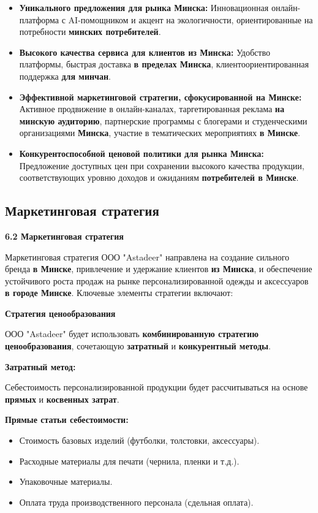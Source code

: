 \begin{itemize}
    \item \textbf{Уникального предложения для рынка Минска:} Инновационная онлайн-платформа с AI-помощником и акцент на экологичности, ориентированные на потребности \textbf{минских потребителей}.
    \item \textbf{Высокого качества сервиса для клиентов из Минска:}  Удобство платформы, быстрая доставка \textbf{в пределах Минска}, клиентоориентированная поддержка \textbf{для минчан}.
    \item \textbf{Эффективной маркетинговой стратегии, сфокусированной на Минске:}  Активное продвижение в онлайн-каналах, таргетированная реклама \textbf{на минскую аудиторию}, партнерские программы с блогерами и студенческими организациями \textbf{Минска}, участие в тематических мероприятиях \textbf{в Минске}.
    \item \textbf{Конкурентоспособной ценовой политики для рынка Минска:}  Предложение доступных цен при сохранении высокого качества продукции, соответствующих уровню доходов и ожиданиям \textbf{потребителей в Минске}.
\end{itemize}

\subsection{Маркетинговая стратегия}

\textbf{6.2 Маркетинговая стратегия}

Маркетинговая стратегия ООО "Astadeer" направлена на создание сильного бренда \textbf{в Минске}, привлечение и удержание клиентов \textbf{из Минска}, и обеспечение устойчивого роста продаж на рынке персонализированной одежды и аксессуаров \textbf{в городе Минске}.  Ключевые элементы стратегии включают:

\vspace{0.9cm}

\textbf{Стратегия ценообразования}

ООО "Astadeer" будет использовать \textbf{комбинированную стратегию ценообразования}, сочетающую \textbf{затратный} и \textbf{конкурентный методы}.

\textbf{Затратный метод:}

Себестоимость персонализированной продукции будет рассчитываться на основе \textbf{прямых} и \textbf{косвенных затрат}.

\textbf{Прямые статьи себестоимости:}

\begin{itemize}[noitemsep]
    \item Стоимость базовых изделий (футболки, толстовки, аксессуары).
    \item Расходные материалы для печати (чернила, пленки и т.д.).
    \item Упаковочные материалы.
    \item Оплата труда производственного персонала (сдельная оплата).
\end{itemize}

